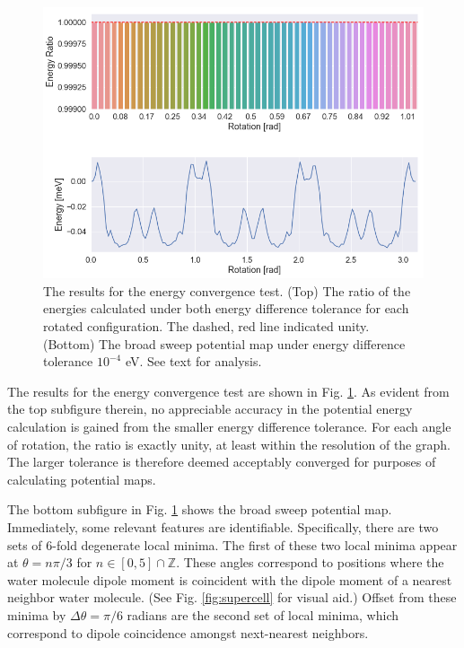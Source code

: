         \begin{figure}
            \centering
            \includegraphics[width=0.8\linewidth]{Figures/System/pmap_convergence.png}
            \caption{The results for the energy convergence test. (Top) The ratio of the energies calculated under both energy difference tolerance for each rotated configuration. The dashed, red line indicated unity. (Bottom) The broad sweep potential map under energy difference tolerance $10^{-4}$ eV. See text for analysis. }
            \label{fig:pmap_convergence}
        \end{figure}
        
        The results for the energy convergence test are shown in Fig. \ref{fig:pmap_convergence}. As evident from the top subfigure therein, no appreciable accuracy in the potential energy calculation is gained from the smaller energy difference tolerance. For each angle of rotation, the ratio is exactly unity, at least within the resolution of the graph. The larger tolerance is therefore deemed acceptably converged for purposes of calculating potential maps.
        
        The bottom subfigure in Fig. \ref{fig:pmap_convergence} shows the broad sweep potential map. Immediately, some relevant features are identifiable. Specifically, there are two sets of 6-fold degenerate local minima. The first of these two local minima appear at $\theta = n\pi/3$ for $n\in \left[0,5\right] \cap \mathbb{Z}$. These angles correspond to positions where the water molecule dipole moment is coincident with the dipole moment of a nearest neighbor water molecule. (See Fig. \ref{fig:supercell} for visual aid.) Offset from these minima by $\Delta \theta = \pi/6$ radians are the second set of local minima, which correspond to dipole coincidence amongst next-nearest neighbors. 
        
